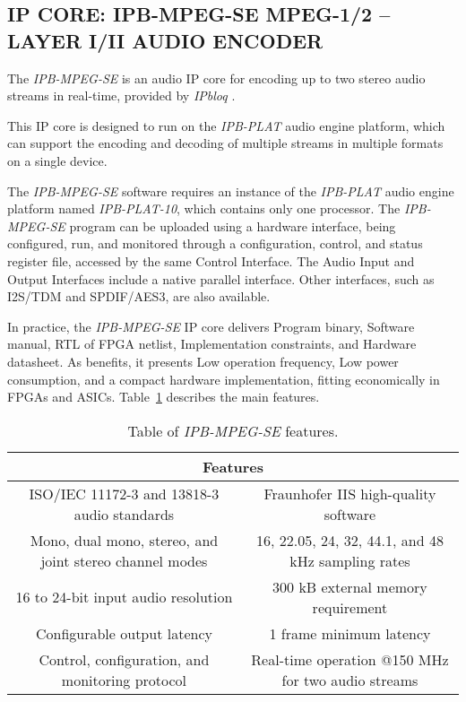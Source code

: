 \subsection{IP CORE: IPB-MPEG-SE MPEG-1/2 – LAYER I/II AUDIO ENCODER}

The \textit{IPB-MPEG-SE} \cite{ipb-mpeg-se} is an audio IP core for encoding up to two stereo audio streams in real-time, provided by \textit{IPbloq} \cite{ipbloq}.

This IP core is designed to run on the \textit{IPB-PLAT} audio engine platform, which can support the encoding and decoding of multiple streams in multiple formats on a single device.

The \textit{IPB-MPEG-SE} software requires an instance of the \textit{IPB-PLAT} audio engine platform named \textit{IPB-PLAT-10}, which contains only one processor. 
The \textit{IPB-MPEG-SE} program can be uploaded using a hardware interface, being configured, run, and monitored through a configuration, control, and status register file, accessed by the same Control Interface.
The Audio Input and Output Interfaces include a native parallel interface. Other interfaces, such as I2S/TDM and SPDIF/AES3, are also available.

In practice, the \textit{IPB-MPEG-SE} IP core delivers Program binary, Software manual, RTL of FPGA netlist, Implementation constraints, and Hardware datasheet.
As benefits, it presents Low operation frequency, Low power consumption, and a compact hardware implementation, fitting economically in FPGAs and ASICs.
Table~\ref{tab:ipbloq} describes the main features.

\begin{table}[h]
    \centering
    \begin{tabular}{|c|c|}
        \hline
        \multicolumn{2}{|c|}{\textbf{Features}} \\
        \hline
         ISO/IEC 11172-3 and 13818-3 audio standards & Fraunhofer IIS high-quality software \\
         \hline
         Mono, dual mono, stereo, and joint stereo channel modes & 16, 22.05, 24, 32, 44.1, and 48 kHz sampling rates \\
         \hline
         16 to 24-bit input audio resolution & 300 kB external memory requirement\\
         \hline
         Configurable output latency & 1 frame minimum latency\\
         \hline
         Control, configuration, and monitoring protocol & Real-time operation @150 MHz for two audio streams\\
         \hline
    \end{tabular}
    \caption{Table of \textit{IPB-MPEG-SE} features.}
    \label{tab:ipbloq}
\end{table}

